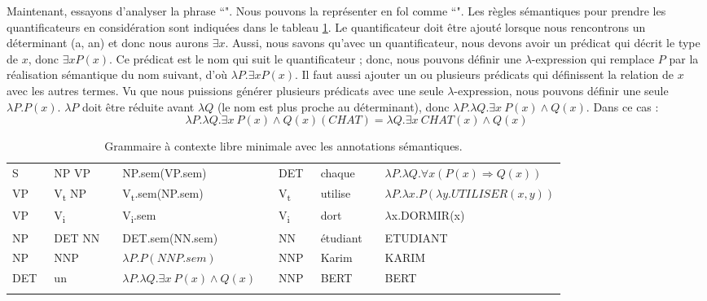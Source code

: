 \documentclass{KodeBook}
\begin{document}
Maintenant, essayons d'analyser la phrase ``".
Nous pouvons la représenter en \ac{fol} comme ``".
Les règles sémantiques pour prendre les quantificateurs en considération sont indiquées dans le tableau \ref{tab:regles-sem2}. 
Le quantificateur doit être ajouté lorsque nous rencontrons un déterminant (a, an) et donc nous aurons $\exists x$. 
Aussi, nous savons qu'avec un quantificateur, nous devons avoir un prédicat qui décrit le type de $x$, donc $\exists x P(x)$.
Ce prédicat est le nom qui suit le quantificateur ; donc, nous pouvons définir une $\lambda $-expression qui remplace $P$ par la réalisation sémantique du nom suivant, d'où $\lambda P.\exists x P(x)$.
Il faut aussi ajouter un ou plusieurs prédicats qui définissent la relation de $x$ avec les autres termes. 
Vu que nous puissions générer plusieurs prédicats avec une seule $\lambda $-expression, nous pouvons définir une seule $\lambda P.P(x)$.
$\lambda P$ doit être réduite avant $\lambda Q$ (le nom est plus proche au déterminant), donc $\lambda P.\lambda Q.\exists x\ P(x) \wedge Q(x)$. 
Dans ce cas : 
\[\lambda P.\lambda Q.\exists x\ P(x) \wedge Q(x)(CHAT) = \lambda Q.\exists x\ CHAT(x) \wedge Q(x)\]

\begin{table}[ht]
	\centering
	\begin{tabular}{lllllllll}
		\cline{1-4}\cline{6-9}\noalign{\vskip\doublerulesep
			\vskip-\arrayrulewidth}\cline{1-4}\cline{6-9}
		S  & \textrightarrow\ NP VP && NP.sem(VP.sem) &&
		DET & \textrightarrow\ chaque && $\lambda P.\lambda Q.\forall x (P(x) \Rightarrow Q(x))$ \\
		
		VP & \textrightarrow\ V\textsubscript{t} NP && V\textsubscript{t}.sem(NP.sem) &&
		V\textsubscript{t}  & \textrightarrow\ utilise && $\lambda P.\lambda x.P(\lambda y.UTILISER(x, y))$ \\
		
		VP & \textrightarrow\ V\textsubscript{i} && V\textsubscript{i}.sem &&
		V\textsubscript{i}  & \textrightarrow\ dort && $ \lambda $x.DORMIR(x) \\
		
		NP & \textrightarrow\ DET NN && DET.sem(NN.sem)  &&
		NN  & \textrightarrow\  étudiant && ETUDIANT \\
		
		NP & \textrightarrow\ NNP && $\lambda P.P(NNP.sem)$  &&
		NNP  & \textrightarrow\  Karim && KARIM \\
		
		DET & \textrightarrow\ un && $\lambda P.\lambda Q.\exists x\ P(x) \wedge Q(x)$  &&
		NNP  & \textrightarrow\  BERT && BERT \\
		\cline{1-4}\cline{6-9}\noalign{\vskip\doublerulesep
			\vskip-\arrayrulewidth}\cline{1-4}\cline{6-9}
	\end{tabular}
	\caption{Grammaire à contexte libre minimale avec les annotations sémantiques.}
	\label{tab:regles-sem2}
\end{table}
\end{document}
